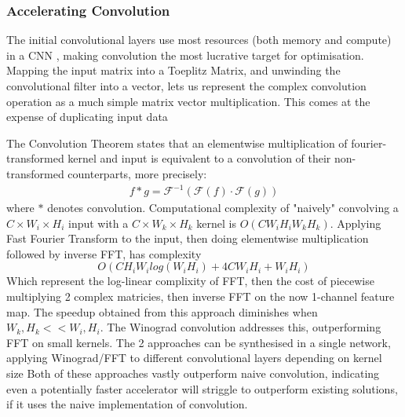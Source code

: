 \documentclass[12pt]{article}
\newcommand{\Fourier}{\mathcal{F}}
\begin{document}
\subsubsection{Accelerating Convolution}
The initial convolutional layers use most resources (both memory and compute) in a CNN
\cite{karpathy2015cs231n},
making convolution the most lucrative target for optimisation.
Mapping the input matrix into a Toeplitz Matrix, and unwinding the convolutional filter into
a vector,
lets us represent the complex convolution operation as a much simple matrix vector
multiplication. This
comes at the expense of duplicating input data \cite{sze2017efficient}

The Convolution Theorem states that an elementwise multiplication of fourier-transformed kernel
and input is equivalent to a convolution of their non-transformed counterparts, more precisely:
\begin{gather}
	f * g = \Fourier^{-1}(\Fourier(f) \cdot \Fourier(g))
\end{gather}
where $*$ denotes convolution.
Computational complexity of "naively" convolving a $C \times W_i \times H_i$ input with a $C
\times W_k \times H_k$ kernel is $O(CW_iH_iW_kH_k)$.
Applying Fast Fourier Transform to the input, then doing elementwise multiplication followed
by inverse FFT, has complexity
$$O(CH_iW_ilog(W_iH_i) + 4CW_iH_i + W_iH_i)$$
Which represent the log-linear complixity of FFT, then the cost of piecewise multiplying 2
complex matricies,
then inverse FFT on the now 1-channel feature map. The speedup obtained from this approach
diminishes when $W_k, H_k << W_i, H_i$\cite{liu2016pruning}.
The Winograd convolution addresses this, outperforming FFT on small kernels.
The 2 approaches can be synthesised in a single network, applying Winograd/FFT to different
convolutional layers depending on kernel size \cite{zhuge2018face}
Both of these approaches vastly outperform naive convolution, indicating even a potentially faster 
accelerator will striggle to outperform existing solutions, if it uses the naive implementation
of convolution.
\end{document}
